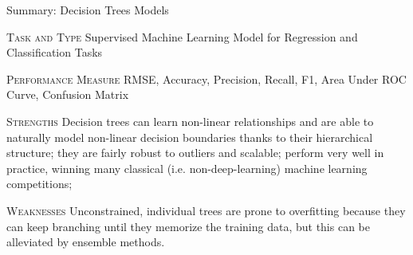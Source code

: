 \documentclass[document.tex]{subfiles}
\begin{document}
    \begin{frame}{Summary: Decision Trees Models}
        \begin{alertblock}{\textsc{Task and Type}}
            Supervised Machine Learning Model for Regression and Classification Tasks
        \end{alertblock}
        \begin{alertblock}{\textsc{Performance Measure}}
            RMSE, Accuracy, Precision, Recall, F1, Area Under ROC Curve, Confusion Matrix
        \end{alertblock}
        \begin{alertblock}{\textsc{Strengths}}
            Decision trees can learn non-linear relationships and are able to naturally model non-linear decision boundaries thanks to their hierarchical structure; they are fairly robust to outliers and scalable; perform very well in practice, winning many classical (i.e. non-deep-learning) machine learning competitions;
        \end{alertblock}
        \begin{alertblock}{\textsc{Weaknesses}}
            Unconstrained, individual trees are prone to overfitting because they can keep branching until they memorize the training data, but this can be alleviated by ensemble methods.
        \end{alertblock}
    \end{frame}
\end{document}
